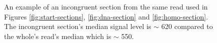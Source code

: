 \begin{figure}
\centering

	\caption{\label{fig:mess-section}An example of an incongruent section from the same read used in Figures \ref{fig:start-sections}, \ref{fig:dna-section} and \ref{fig:homo-section}. The incongruent section's median signal level is $\sim$ 620 compared to the whole's read's median which is $\sim$ 550.}
\end{figure}
